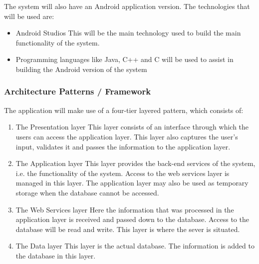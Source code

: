\documentclass[hidelinks,a4paper,12pt]{article}
\begin{document}
		\begin{flushleft}
			The system will also have an Android application version. The technologies that will be used are:
		\end{flushleft}
		\begin{itemize} 
			\item Android Studios
			\newline
			This will be the main technology used to build the main functionality of the system.
			
			\item Programming languages like Java, C++ and C will be used to assist in building the Android version of the system  
			\end{itemize} 
		
		\subsubsection{ Architecture Patterns / Framework }
		
		The application will make use of a four-tier layered pattern, which consists of:
	
	\begin{enumerate} 
			\item The Presentation layer
			\newline
		This layer consists of an interface through which the users can access the application layer. This 	layer also captures the user's input, validates it and passes the information to the application 	layer.
		
			\item The Application layer 
			\newline
		This layer provides the back-end services of the system, i.e. the functionality of the system. 	Access to the web services layer is managed in this layer. The application layer may also be 	used as temporary storage when the database cannot be accessed.
		
			\item The Web Services layer
			\newline
		Here the information that was processed in the application layer is received and passed 	down to the database. Access to the database will be read and write. This layer is where the 	sever is situated.
		
			\item The Data layer
			\newline
		This layer is the actual database. The information is added to the database in this layer.
	\end{enumerate}
	
\end{document}
